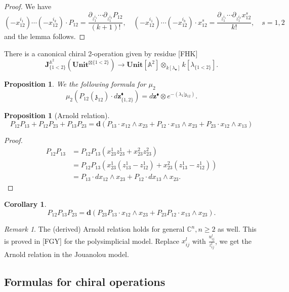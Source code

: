 \documentclass[11pt]{amsart}
\newtheorem{cor}[thm]{Corollary}
\newtheorem{prop}[thm]{Proposition}
\theoremstyle{definition}
\theoremstyle{remark}
\newtheorem{rem}[thm]{Remark}
\numberwithin{equation}{section}
\begin{document}
\begin{proof}
  We have
  $$
  (-x^{i_1}_{12})\cdots (-x^{i_k}_{12})\cdot P_{12}=\frac{\partial_{z^{i_1}_1}\cdots \partial_{z^{i_k}_1}P_{12}}{  (k+1)!},\quad   (-x^{i_1}_{12})\cdots (-x^{i_k}_{12})\cdot x^s_{12}=\frac{\partial_{z^{i_1}_1}\cdots \partial_{z^{i_k}_1}x^s_{12}}{  k!},\quad s=1,2
  $$
  and the lemma follows.
\end{proof}

There is a canonical chiral 2-operation  given by residue [FHK]
$$
\mathbf{J}^{\mathbb{A}^2}_{\{1<2\}}(\mathbf{Unit}^{\boxtimes\{1<2\} })\rightarrow \mathbf{Unit}[\mathbb{A}^2]\otimes_{k[\lambda_{\bullet}]}k[\lambda_{\{1<2\}}].
$$

\begin{prop}
We the following formula for $\mu_2$
$$
\mu_2\left(P_{12}(\mathfrak{z}_{12})\cdot  d\mathbf{z}^{\blacklozenge}_{\{1,2\}}\right)=d\mathbf{z}^{\blacklozenge}\otimes e^{-(\lambda_1|\mathfrak{z}_{12})}.
$$
\end{prop}

\begin{prop}[Arnold relation]
  $$
  P_{12}P_{13}+P_{12}P_{23}+P_{13}P_{23}=\mathbf{d}\left(P_{13}\cdot x_{12}\wedge x_{23}+P_{12}\cdot x_{13}\wedge x_{23}+P_{23}\cdot x_{12}\wedge x_{13}\right)
  $$
\end{prop}
\begin{proof}

  \begin{align*}
   P_{12}P_{13}  &=P_{12}P_{13}(x^1_{23}z^1_{23}+x^2_{23}z^2_{23})  \\
     & =P_{12}P_{13}\left(x^1_{23}(z^1_{13}-z^1_{12})+x^2_{23}(z^1_{13}-z^1_{12})\right)\\
     &=P_{13}\cdot dx_{12}\wedge x_{23}+P_{12}\cdot dx_{13}\wedge x_{23}.
  \end{align*}
\end{proof}
\begin{cor}\label{RecursiveLemma}
  $$
  P_{12}P_{13}P_{23}=\mathbf{d}\left(P_{23}P_{13}\cdot x_{12}\wedge x_{23}+P_{23}P_{12}\cdot x_{13}\wedge x_{23}\right).
  $$
\end{cor}

\begin{rem}
  The (derived) Arnold relation holds for general $\mathbb{C}^n,n\geq 2$ as well. This is proved in [FGY] for the polysimplicial model. Replace $x^l_{ij}$ with $\frac{u^l_{ij}}{z^l_{ij}}$, we get the Arnold relation in the Jouanolou model.
\end{rem}
\subsection{Formulas for chiral operations}
\end{document}
